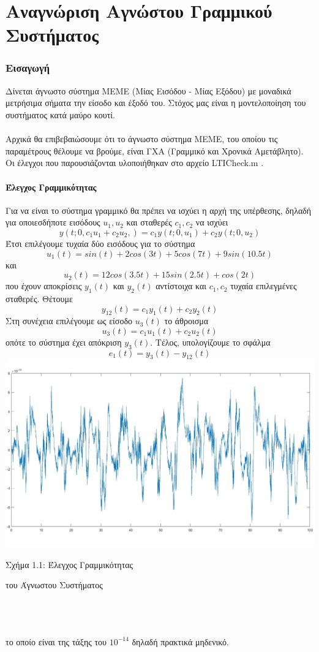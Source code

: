 \documentclass[12pt]{article}
\begin{document}
\newpage
\part*{Αναγνώριση Αγνώστου Γραμμικού Συστήματος}
\section{Εισαγωγή}
Δίνεται άγνωστο σύστημα ΜΕΜΕ (Μίας Εισόδου - Μίας Εξόδου) με μοναδικά μετρήσιμα σήματα την είσοδο και έξοδό του. Στόχος μας είναι η μοντελοποίηση του συστήματος κατά μαύρο κουτί.
\\ \\
Αρχικά θα επιβεβαιώσουμε ότι το άγνωστο σύστημα ΜΕΜΕ, του οποίου τις παραμέτρους θέλουμε να βρούμε, είναι ΓΧΑ (Γραμμικό και Χρονικά Αμετάβλητο). Οι έλεγχοι που παρουσιάζονται υλοποιήθηκαν στο αρχείο LTICheck.m .
\subsection{Έλεγχος Γραμμικότητας}
Για να είναι το σύστημα γραμμικό θα πρέπει να ισχύει η αρχή της υπέρθεσης, δηλαδή για οποιεσδήποτε εισόδους $u_1,u_2$ και σταθερές $c_1 ,c_2 $ να ισχύει
\[y \left(t;0,c_1 u_1+ c_2 u_2, \right)=c_1 y(t;0,u_1) + c_2 y(t;0,u_2 ) \]
Έτσι επιλέγουμε τυχαία δύο εισόδους για το σύστημα
\[ u_1(t)=sin(t)+2cos(3t)+5cos(7t)+9sin(10.5t) \] και 
\[ u_2(t)=12cos(3.5t)+15sin(2.5t) + cos(2t) \]
που έχουν αποκρίσεις $y_1(t)$ και $y_2(t)$ αντίστοιχα και $c_1 ,c_2 $ τυχαία επιλεγμένες σταθερές.
Θέτουμε 
\[ y_{12}(t)=c_1y_1(t)+c_2y_2(t)\]
Στη συνέχεια επιλέγουμε ως είσοδο $u_3(t)$ το άθροισμα
\[ u_3(t)=c_1u_1(t)+c_2u_2(t) \]
οπότε το σύστημα έχει απόκριση $y_3(t)$. Τέλος, υπολογίζουμε το σφάλμα
\[e_{1}(t)=y_3(t)-y_{12}(t)\]
\includegraphics[width=\linewidth]{linear.jpg}
\centerline{Σχήμα 1.1:  Έλεγχος Γραμμικότητας}
\centerline{του Άγνωστου Συστήματος}
\\ \\ \\
το οποίο είναι της τάξης του $10^{-14}$ δηλαδή πρακτικά μηδενικό. 
\end{document}
